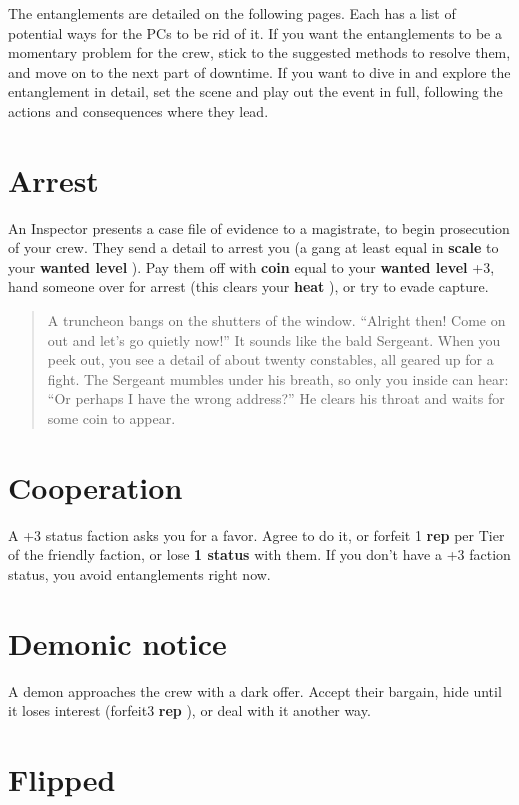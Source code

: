 \documentclass[11pt,fleqn,a5paper]{book}
\newcommand{\gameterm}[1]{\textbf{#1}}
\begin{document}
The entanglements are detailed on the following pages. Each has a list of potential ways for the PCs to be rid of it. If you want the entanglements to be a momentary problem for the crew, stick to the suggested methods to resolve them, and move on to the next part of downtime. If you want to dive in and explore the entanglement in detail, set the scene and play out the event in full, following the actions and consequences where they lead.

\section{Arrest}

An Inspector presents a case file of evidence to a magistrate, to begin prosecution of your crew. They send a detail to arrest you (a gang at least equal in \textbf{scale} to your \gameterm{wanted level} ). Pay them off with \gameterm{coin}  equal to your \gameterm{wanted level}  +3, hand someone over for arrest (this clears your \gameterm{heat} ), or try to evade capture.

\begin{quote}
	A truncheon bangs on the shutters of the window. “Alright then! Come on out and let’s go quietly now!” It sounds like the bald Sergeant. When you peek out, you see a detail of about twenty constables, all geared up for a fight. The Sergeant mumbles under his breath, so only you inside can hear: “Or perhaps I have the wrong address?” He clears his throat and waits for some coin to appear.
\end{quote} 

\section{Cooperation}

A +3 status faction asks you for a favor. Agree to do it, or forfeit 1 \gameterm{rep}  per Tier of the friendly faction, or lose \textbf{1 status} with them. If you don’t have a +3 faction status, you avoid entanglements right now.

\section{Demonic notice}

A demon approaches the crew with a dark offer. Accept their bargain, hide until it loses interest (forfeit3 \gameterm{rep} ), or deal with it another way.

\section{Flipped}
\end{document}
